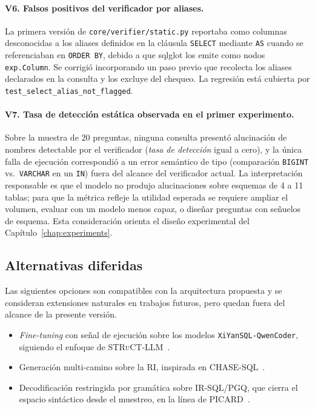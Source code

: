 \paragraph{V6. Falsos positivos del verificador por aliases.} La primera versión de \texttt{core/verifier/static.py} reportaba como columnas desconocidas a los aliases definidos en la cláusula \texttt{SELECT} mediante \texttt{AS} cuando se referenciaban en \texttt{ORDER BY}, debido a que sqlglot los emite como nodos \texttt{exp.Column}. Se corrigió incorporando un paso previo que recolecta los aliases declarados en la consulta y los excluye del chequeo. La regresión está cubierta por \texttt{test\_select\_alias\_not\_flagged}.

\paragraph{V7. Tasa de detección estática observada en el primer experimento.} Sobre la muestra de 20 preguntas, ninguna consulta presentó alucinación de nombres detectable por el verificador (\emph{tasa de detección} igual a cero), y la única falla de ejecución correspondió a un error semántico de tipo (comparación \texttt{BIGINT} vs.\ \texttt{VARCHAR} en un \texttt{IN}) fuera del alcance del verificador actual. La interpretación responsable es que el modelo no produjo alucinaciones sobre esquemas de 4 a 11 tablas; para que la métrica refleje la utilidad esperada se requiere ampliar el volumen, evaluar con un modelo menos capaz, o diseñar preguntas con señuelos de esquema. Esta consideración orienta el diseño experimental del Capítulo~\ref{chap:experiments}.

\subsection{Alternativas diferidas}

Las siguientes opciones son compatibles con la arquitectura propuesta y se consideran extensiones naturales en trabajos futuros, pero quedan fuera del alcance de la presente versión.

\begin{itemize}
    \item \emph{Fine-tuning} con señal de ejecución sobre los modelos \texttt{XiYanSQL-QwenCoder}, siguiendo el enfoque de \textsc{STRuCT-LLM}~\cite{STRuCT-LLM2026}.
    \item Generación multi-camino sobre la \ac{RI}, inspirada en \textsc{CHASE-SQL}~\cite{CHASE-SQL2025}.
    \item Decodificación restringida por gramática sobre IR-SQL/PGQ, que cierra el espacio sintáctico desde el muestreo, en la línea de \textsc{PICARD}~\cite{PICARD2022}.
\end{itemize}

